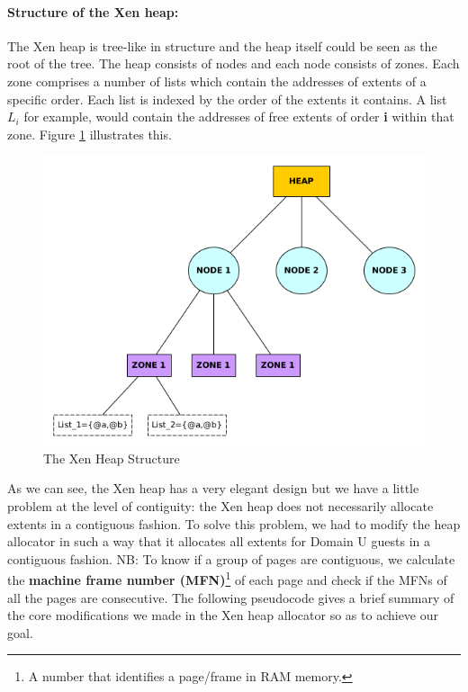 \documentclass[sigconf]{sigplanconf}
\begin{document}
  \paragraph{Structure of the Xen heap:} The Xen heap is tree-like in structure and the heap itself could be seen as the root of the tree. The heap consists of nodes and each node consists of zones. Each zone comprises a number of lists which contain the addresses of extents of a specific order. Each list is indexed by the order of the extents it contains. A list $L_i$ for example, would contain the addresses of free extents of order \textbf{i} within that zone. Figure \ref{fig:xenheap} illustrates this.
  
  \begin{figure}[!h]
  	\centering
  	\includegraphics[scale=0.45]{xen_heap.png}
  	\caption{The Xen Heap Structure}
  	\label{fig:xenheap}
  \end{figure}
  \newpage
  As we can see, the Xen heap has a very elegant design but we have a little problem at the level of contiguity: the Xen heap does not necessarily allocate extents in a contiguous fashion. To solve this problem, we had to modify the heap allocator in such a way that it allocates all extents for Domain U guests in a contiguous fashion. NB: To know if a group of pages are contiguous, we calculate the \textbf{machine frame number (MFN)}\footnote{ A number that identifies a page/frame in RAM memory.} of each page and check if the MFNs of all the pages are consecutive. The following pseudocode gives a brief summary of the core modifications we made in the Xen heap allocator so as to achieve our goal.
\end{document}
